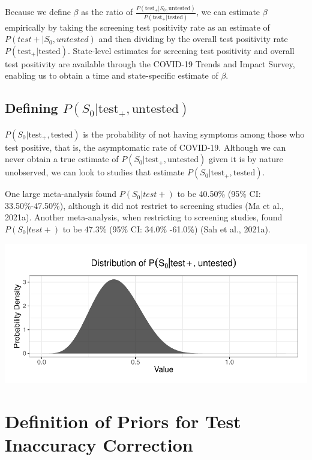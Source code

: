 \documentclass[12pt,twoside]{smiththesis}
\begin{document}
Because we define \(\beta\) as the ratio of \(\frac{P(\text{test}_+ |S_0, \text{untested})}{P(\text{test}_+|\text{tested})}\), we can estimate \(\beta\) empirically by taking the screening test positivity rate as an estimate of \(P(test + |S_0, untested)\) and then dividing by the overall test positivity rate \(P(\text{test}_+|\text{tested})\). State-level estimates for screening test positivity and overall test positivity are available through the COVID-19 Trends and Impact Survey, enabling us to obtain a time and state-specific estimate of \(\beta\).

\hypertarget{defining-ps_0texttest_textuntested}{%
\subsection{\texorpdfstring{Defining \(P(S_0|\text{test}_+,\text{untested})\)}{Defining P(S\_0\textbar\textbackslash text\{test\}\_+,\textbackslash text\{untested\})}}\label{defining-ps_0texttest_textuntested}}

\(P(S_0|\text{test}_+,\text{tested})\) is the probability of not having symptoms among those who test positive, that is, the asymptomatic rate of COVID-19. Although we can never obtain a true estimate of \(P(S_0|\text{test}_+,\text{untested})\) given it is by nature unobserved, we can look to studies that estimate \(P(S_0|\text{test}_+,\text{tested})\).

One large meta-analysis found \(P(S_0|test+)\) to be 40.50\% (95\% CI: 33.50\%-47.50\%), although it did not restrict to screening studies (Ma et al., 2021a). Another meta-analysis, when restricting to screening studies, found \(P(S_0|test+)\) to be 47.3\% (95\% CI: 34.0\% -61.0\%) (Sah et al., 2021a).
\begin{center}\includegraphics[width=0.8\linewidth]{thesis_files/figure-latex/unnamed-chunk-60-1} \end{center}

\hypertarget{definition-of-priors-for-test-inaccuracy-correction}{%
\section{Definition of Priors for Test Inaccuracy Correction}\label{definition-of-priors-for-test-inaccuracy-correction}}
\end{document}
